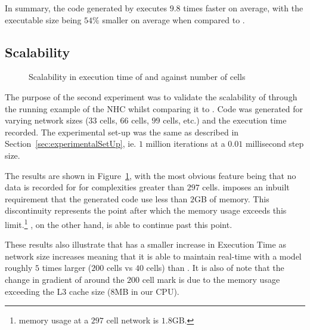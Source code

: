 In summary, the code generated by \ourTool executes $9.8$ times faster
on average, with the executable size being $54\%$ smaller on average
when compared to \simulink.  \ 


\subsection{Scalability}

\begin{figure}[htbp]
  \centering
  
  \caption{Scalability in  execution time of \simulink and \ourTool against number of cells}
  \label{fig:scalability}
\end{figure}

The purpose of the second experiment was to validate the scalability of
\ourTool through the running example of the \ac{NHC} whilst comparing it
to \simulink.  Code was generated for varying network sizes ($33$ cells,
$66$ cells, $99$ cells, etc.) and the execution time recorded.  The
experimental set-up was the same as described in
Section~\ref{sec:experimentalSetUp}, ie. $1$ million iterations at a
$0.01$ millisecond step size.

The results are shown in Figure~\ref{fig:scalability}, with the most
obvious feature being that no data is recorded for \simulink for
complexities greater than $297$ cells.  \simulink imposes an inbuilt
requirement that the generated code use less than $2$GB of memory. This
discontinuity represents the point after which the memory usage exceeds
this limit.\footnote{\simulink memory usage at a $297$ cell network is
  $1.8$GB.}  \ourTool, on the other hand, is able to continue past this
point.

These results also illustrate that \ourTool has a smaller increase in
Execution Time as network size increases meaning that it is able to
maintain real-time with a model roughly $5$ times larger ($200$ cells vs
$40$ cells) than \simulink.  It is also of note that the change in
gradient of \ourTool around the $200$ cell mark is due to the memory
usage exceeding the L$3$ cache size ($8$MB in our CPU).


